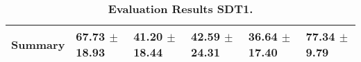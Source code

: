 \begin{table}[htb]
{\begin{tabular}{llllll}
\midrule
\textbf{Summary                                  } &                  \phantom{0}67.73 $\pm$ 18.93 &                      \phantom{0}41.20 $\pm$ 18.44 &                  \phantom{0}42.59 $\pm$ 24.31 &            \phantom{0}36.64 $\pm$ 17.40 &  \phantom{0}77.34 $\pm$ \phantom{0}9.79 \\
\bottomrule
\end{tabular}%
}
\caption{\textbf{Evaluation Results SDT1.}}
\label{tab:eval-results}
\end{table}


